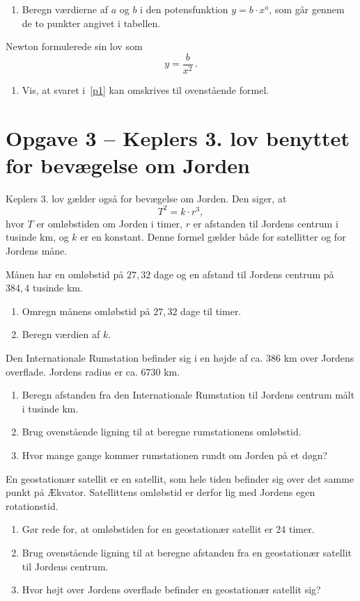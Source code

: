 \documentclass[12pt,oneside,a4paper]{article}
\theoremstyle{plain}
\begin{document}
\begin{enumerate}[label=(\alph*) ,resume]
    \item Beregn værdierne af $a$ og $b$ i den potensfunktion $y=b\cdot x^a$,
        som går gennem de to punkter angivet i tabellen. \label{p1}
\end{enumerate}

Newton formulerede sin lov som
$$
y = \frac{b}{x^2}\,.
$$

\begin{enumerate}[label=(\alph*) ,resume]
    \item Vis, at svaret i~\ref{p1} kan omskrives til ovenstående formel.
\end{enumerate}


\section*{Opgave 3 -- Keplers 3. lov benyttet for bevægelse om Jorden}
Keplers 3. lov gælder også for bevægelse om Jorden. Den siger, at
$$
T^2 = k\cdot r^3,
$$
hvor $T$ er omløbstiden om Jorden i timer, $r$ er afstanden til Jordens centrum
i tusinde km, og $k$ er en konstant. Denne formel gælder både for satellitter
og for Jordens måne.

Månen har en omløbstid på $27,32$ dage og en afstand til Jordens centrum på
$384,4$ tusinde km.
\begin{enumerate}[label=(\alph*)]
    \item Omregn månens omløbstid på $27,32$ dage til timer.
    \item Beregn værdien af $k$.
\end{enumerate}



Den Internationale Rumstation befinder sig i en højde af ca. $386$ km over
Jordens overflade. Jordens radius er ca. $6730$ km.
\begin{enumerate}[label=(\alph*), resume]
    \item Beregn afstanden fra den Internationale Rumstation til Jordens
        centrum målt i tusinde km.
    \item Brug ovenstående ligning til at beregne rumstationens omløbstid.
    \item Hvor mange gange kommer rumstationen rundt om Jorden på et døgn?
\end{enumerate}


En geostationær satellit er en satellit, som hele tiden befinder sig over det
samme punkt på Ækvator.  Satellittens omløbstid er derfor lig med
Jordens egen rotationstid.
\begin{enumerate}[label=(\alph*), resume]
    \item Gør rede for, at omløbstiden for en geostationær satellit er 24 timer.
    \item Brug ovenstående ligning til at beregne afstanden fra en geostationær
        satellit til Jordens centrum.
    \item Hvor højt over Jordens overflade befinder en geostationær satellit sig?
\end{enumerate}
\end{document}

